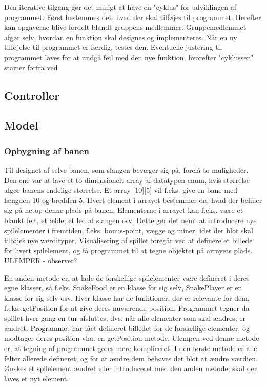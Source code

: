 \documentclass{report}
\begin{document}
Den iterative tilgang gør det muligt at have en "cyklus" for udviklingen af programmet. Først bestemmes det, hvad der skal tilføjes til programmet. Herefter kan opgaverne blive fordelt blandt gruppens medlemmer. Gruppemedlemmet afgør selv, hvordan en funktion skal designes og implementeres. Når en ny tilføjelse til programmet er færdig, testes den. Eventuelle justering til programmet laves for at undgå fejl med den nye funktion, hvorefter "cyklussen" starter forfra ved

\subsection{Controller}
	
\subsection{Model}

\subsubsection{Opbygning af banen}
Til designet af selve banen, som slangen bevæger sig på, forelå to muligheder. Den ene var at lave et to-dimensionelt array af datatypen enum, hvis størrelse afgør banens endelige størrelse. Et array [10][5] vil f.eks. give en bane med længden 10 og bredden 5. Hvert element i arrayet bestemmer da, hvad der befiner sig på netop denne plads på banen. Elementerne i arrayet kan f.eks. være et blankt felt, et æble, et led af slangen osv. Dette gør det nemt at introducere nye spilelementer i fremtiden, f.eks. bonus-point, vægge og miner, idet der blot skal tilføjes nye værdityper. Visualisering af spillet foregår ved at definere et billede for hvert spilelement, og få programmet til at tegne objektet på arrayets plads.
ULEMPER - observer?

En anden metode er, at lade de forskellige spilelementer være defineret i deres egne klasser, så f.eks. SnakeFood er en klasse for sig selv, SnakePlayer er en klasse for sig selv osv. Hver klasse har de funktioner, der er relevante for dem, f.eks. getPosition for at give deres nuværende position. Programmet tegner da spillet hver gang en tur afsluttes, dvs. når alle elementer som skal ændres, er ændret. Programmet har fået defineret billedet for de forskellige elementer, og modtager deres position vha. en getPosition metode.
 Ulempen ved denne metode er, at tegning af programmet gøres mere kompliceret. I den første metode er alle felter allerede defineret, og for at ændre dem behøves det blot at ændre værdien. Ønskes et spilelement ændret eller introduceret med den anden metode, skal der laves et nyt element.
 
\end{document}
